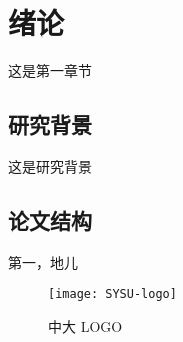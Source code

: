 \chapter{绪论}

这是第一章节

\section{研究背景}

这是研究背景

\section{论文结构}

第一，地儿

\begin{figure}[htbp]
    \centering
    \texttt{[image: SYSU-logo]}
    \caption{中大 LOGO}
\end{figure}
